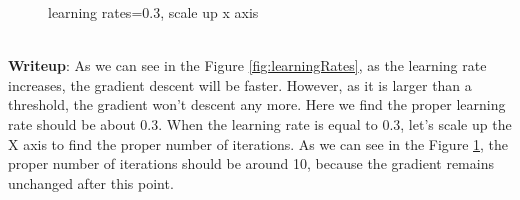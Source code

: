 \documentclass[paper=a4, fontsize=11pt]{scrartcl} %
\numberwithin{equation}{section} %
\numberwithin{figure}{section} %
\numberwithin{table}{section} %
\begin{document}
\begin{itemize}
\begin{figure}
         		\caption{learning rates=0.3, scale up x axis}
         		\label{fig:learningRatesSpecific}
         	\end{figure}
         \\ \textbf{Writeup}: As we can see in the Figure \ref{fig:learningRates}, as the learning rate increases, the gradient descent will be faster. However, as it is larger than a threshold, the gradient won't descent any more. Here we find the proper learning rate should be about 0.3. When the learning rate is equal to 0.3, let's scale up the X axis to find the proper number of iterations. As we can see in the Figure \ref{fig:learningRatesSpecific}, the proper number of iterations should be around 10, because the gradient remains unchanged after this point.
\end{itemize}
\end{document}
